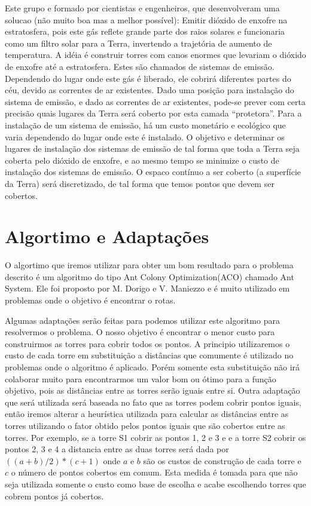 \documentclass[12pt]{article}
\begin{document}
Este grupo e formado por cientistas e engenheiros, que desenvolveram
uma solucao (não muito boa mas a melhor possível): Emitir dióxido 
de enxofre na estratosfera, pois este gás reflete grande parte dos 
raios solares e funcionaria como um filtro solar para a Terra, 
invertendo a trajetória de aumento de temperatura. A idéia é construir 
torres com canos enormes que levariam o dióxido de enxofre até a estratosfera. 
Estes são chamados de sistemas de emissão. Dependendo do lugar onde 
este gás é liberado, ele cobrirá diferentes partes do céu, devido as 
correntes de ar existentes. Dado uma posição para instalação do sistema 
de emissão, e dado as correntes de ar existentes, pode-se prever com 
certa precisão quais lugares da Terra será coberto por esta camada 
“protetora”. Para a instalação de um sistema de emissão, há um custo 
monetário e ecológico que varia dependendo do lugar onde este é instalado. 
O objetivo e determinar os lugares de instalação dos sistemas de emissão 
de tal forma que toda a Terra seja coberta pelo dióxido de enxofre, e ao 
mesmo tempo se minimize o custo de instalação dos sistemas de emissão. 
O espaco contínuo a ser coberto (a superfície da Terra) será discretizado, 
de tal forma que temos pontos que devem ser cobertos. 

\section{Algortimo e Adaptações}

O algortimo que iremos utilizar para obter um bom resultado para o problema
descrito é um algoritmo do tipo Ant Colony Optimization(ACO) chamado Ant System.
Ele foi proposto por M. Dorigo e V. Maniezzo e é muito utilizado em 
problemas onde o objetivo é encontrar o rotas.

Algumas adaptações serão feitas para podemos utilizar este algoritmo para
resolvermos o problema. O nosso objetivo é encontrar o menor custo para 
construirmos as torres para cobrir todos os pontos. A principio utilizaremos
o custo de cada torre em substituição a distâncias que comumente é utilizado no problemas
onde o algoritmo é aplicado. Porém somente esta substituição não irá
colaborar muito para encontrarmos um valor bom ou ótimo para a função 
objetivo, pois as distâncias entre as torres serão iguais entre si. Outra
adaptação que será utilizada será baseada no fato que as torres podem
cobrir pontos iguais, então iremos alterar a heurística utilizada para calcular
as distâncias entre as torres utilizando o fator obtido pelos pontos iguais que são 
cobertos entre as torres. Por exemplo, se a torre S1 cobrir as pontos 1, 2 e 3 e 
e a torre S2 cobrir os pontos 2, 3 e 4 a distancia entre as duas torres
será dada por $((a+b)/2)*(c+1)$ onde $a$ e $b$ são os custos de construção de 
cada torre e $c$ o número de pontos cobertos em comum. Esta medida é tomada
para que não seja utilizada somente o custo como base de escolha e acabe escolhendo
torres que cobrem pontos já cobertos.
\end{document}
